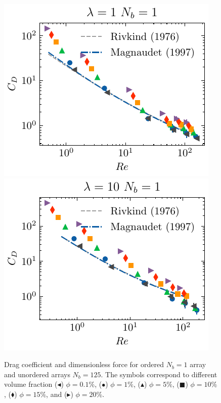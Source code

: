 \begin{figure}[h!]
    \includegraphics[height = 0.35\textwidth]{image/HOMOGENEOUS/fCA/Cp_N_1_l_1.pdf}
    \includegraphics[height = 0.35\textwidth]{image/HOMOGENEOUS/fCA/Cp_N_1_l_10.pdf}
    \caption{
        Drag coefficient and dimensionless force for ordered $N_b=1$ array and unordered arrays $N_b=125$. 
        The symbols correspond to different volume fraction ($\blacktriangleleft$) $\phi = 0.1$\%, ($\bullet$) $\phi = 1\%$, ($\blacktriangle$) $\phi = 5\%$, ($\blacksquare$) $\phi = 10\%$, ($\blacklozenge$) $\phi = 15\%$, and ($\blacktriangleright$) $\phi = 20$\%.
    }
    \label{fig:Cp}
\end{figure}

